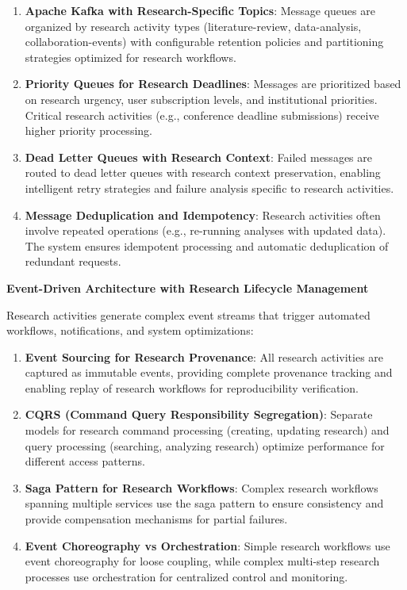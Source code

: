 \documentclass[10pt,twocolumn]{article}
\begin{document}
\begin{enumerate}
    \item \textbf{Apache Kafka with Research-Specific Topics}: Message queues are organized by research activity types (literature-review, data-analysis, collaboration-events) with configurable retention policies and partitioning strategies optimized for research workflows.
    
    \item \textbf{Priority Queues for Research Deadlines}: Messages are prioritized based on research urgency, user subscription levels, and institutional priorities. Critical research activities (e.g., conference deadline submissions) receive higher priority processing.
    
    \item \textbf{Dead Letter Queues with Research Context}: Failed messages are routed to dead letter queues with research context preservation, enabling intelligent retry strategies and failure analysis specific to research activities.
    
    \item \textbf{Message Deduplication and Idempotency}: Research activities often involve repeated operations (e.g., re-running analyses with updated data). The system ensures idempotent processing and automatic deduplication of redundant requests.
\end{enumerate}

\textbf{Event-Driven Architecture with Research Lifecycle Management}

Research activities generate complex event streams that trigger automated workflows, notifications, and system optimizations:

\begin{enumerate}
    \item \textbf{Event Sourcing for Research Provenance}: All research activities are captured as immutable events, providing complete provenance tracking and enabling replay of research workflows for reproducibility verification.
    
    \item \textbf{CQRS (Command Query Responsibility Segregation)}: Separate models for research command processing (creating, updating research) and query processing (searching, analyzing research) optimize performance for different access patterns.
    
    \item \textbf{Saga Pattern for Research Workflows}: Complex research workflows spanning multiple services use the saga pattern to ensure consistency and provide compensation mechanisms for partial failures.
    
    \item \textbf{Event Choreography vs Orchestration}: Simple research workflows use event choreography for loose coupling, while complex multi-step research processes use orchestration for centralized control and monitoring.
\end{enumerate}
\end{document}
